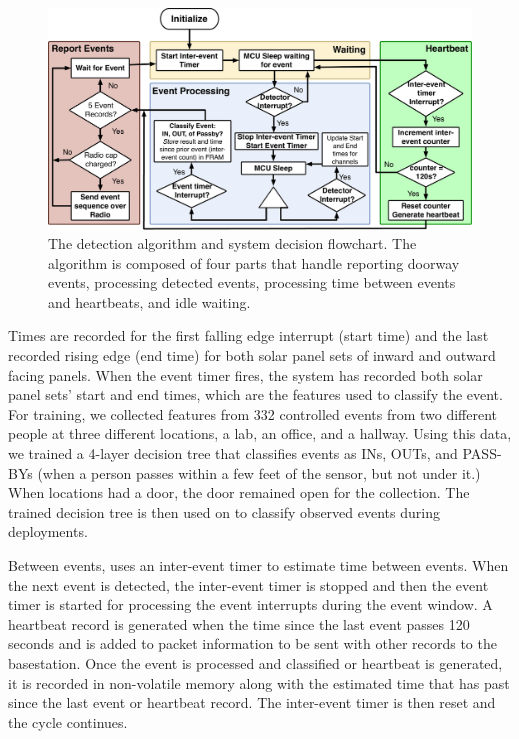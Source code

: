 \begin{figure}[t]
\centering
\includegraphics[width=0.75\columnwidth]{figs/software_update.pdf}
\caption{The \sysname detection algorithm and system decision flowchart. The algorithm is composed of four parts that handle reporting doorway events, processing detected events, processing time between events and heartbeats, and idle waiting. \label{fig:software}}
\end{figure}


Times are recorded for the first falling edge interrupt (start time) and the last recorded rising edge (end time) for both solar panel sets of inward and outward facing panels.
When the event timer fires, the system has recorded both solar panel sets' start and end times, which are the features used to classify the event.
For training, we collected features from 332 controlled events from two different people at three different locations, a lab, an office, and a hallway.
Using this data, we trained a 4-layer decision tree that classifies events as INs, OUTs, and PASS-BYs (when a person passes within a few feet of the sensor, but not under it.)
When locations had a door, the door remained open for the collection.  %
The trained decision tree is then used on \sysname to classify observed events during deployments.  


Between events, \sysname uses an inter-event timer to estimate time between events.  
When the next event is detected, the inter-event timer is stopped and then the event timer is started for processing the event interrupts during the event window.
A heartbeat record is generated when the time since the last event passes 120 seconds and is added to packet information to be sent with other records to the basestation. 
Once the event is processed and classified or heartbeat is generated, it is recorded in non-volatile memory along with the estimated time that has past since the last event or heartbeat record.  
The inter-event timer is then reset and the cycle continues.


